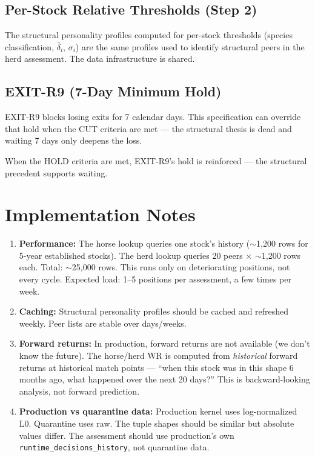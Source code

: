 \documentclass[11pt, a4paper]{article}
\begin{document}
\subsection{Per-Stock Relative Thresholds (Step 2)}

The structural personality profiles computed for per-stock thresholds (species
classification, $\bar{\delta}_i$, $\sigma_i$) are the same profiles used to
identify structural peers in the herd assessment. The data infrastructure
is shared.

\subsection{EXIT-R9 (7-Day Minimum Hold)}

EXIT-R9 blocks losing exits for 7 calendar days. This specification can
override that hold when the CUT criteria are met --- the structural thesis
is dead and waiting 7 days only deepens the loss.

When the HOLD criteria are met, EXIT-R9's hold is reinforced --- the
structural precedent supports waiting.

\section{Implementation Notes}

\begin{enumerate}
  \item \textbf{Performance:} The horse lookup queries one stock's history
        ($\sim$1,200 rows for 5-year established stocks). The herd lookup
        queries 20 peers $\times$ $\sim$1,200 rows each. Total: $\sim$25,000
        rows. This runs only on deteriorating positions, not every cycle.
        Expected load: 1--5 positions per assessment, a few times per week.
  \item \textbf{Caching:} Structural personality profiles should be cached
        and refreshed weekly. Peer lists are stable over days/weeks.
  \item \textbf{Forward returns:} In production, forward returns are not
        available (we don't know the future). The horse/herd WR is computed
        from \emph{historical} forward returns at historical match points ---
        ``when this stock was in this shape 6 months ago, what happened
        over the next 20 days?'' This is backward-looking analysis, not
        forward prediction.
  \item \textbf{Production vs quarantine data:} Production kernel uses
        log-normalized L0. Quarantine uses raw. The tuple shapes should be
        similar but absolute values differ. The assessment should use
        production's own \texttt{runtime\_decisions\_history}, not quarantine
        data.
\end{enumerate}
\end{document}
